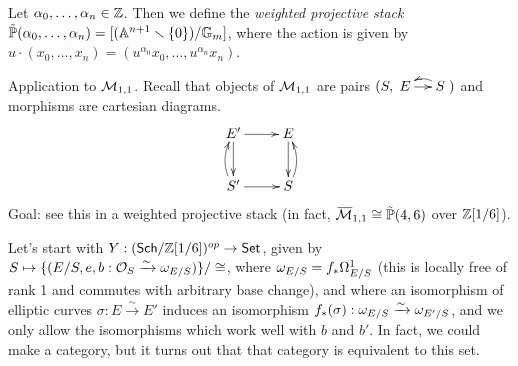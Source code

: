  \begin{example}
   Let $\alpha_0,\dots, \alpha_n\in \mathbb{Z}$. Then we define the
\emph{weighted projective stack} $\tilde {\mathbb{P}}(\alpha_0,\dots,
\alpha_n) = [(\mathbb{A}^{n+1}\smallsetminus\{0\})/\mathbb{G}_m]$, where the action is
given by $u\cdot (x_0,\dots, x_n)=(u^{\alpha_0}x_0,\dots,
u^{\alpha_n}x_n)$.
 \end{example}
 Application to $\mathcal{M}_{1,1}$. Recall that objects of $\mathcal{M}_{1,1}$ are
pairs
 $(S,\xymatrix@-1pc{E\ar[r] & S\ar@/_/[l]})$ and morphisms are
cartesian diagrams.
 \[\xymatrix{
    E'\ar[d]\ar[r] & E\ar[d]\\
    S'\ar[r]\ar@/^/[u] & S\ar@/_/[u]
 }\]
  Goal: see this in a weighted projective stack (in fact,
$\bbar\M_{1,1}\cong
 \tilde\PP(4,6)$ over $\mathbb{Z}[1/6]$).

 Let's start with $Y:(\text{\sf Sch}/\mathbb{Z}[1/6])^{op}\to \text{\sf Set}$, given by $S\mapsto
 \{(E/S,e,b:\mathcal{O}_S\xrightarrow\sim \omega_{E/S})\}/\cong$, where
$\omega_{E/S}=f_*\Omega^1_{E/S}$ (this
 is locally free of rank 1 and commutes with arbitrary base change),
and where an
 isomorphism of elliptic curves $\sigma:E\xrightarrow\sim E'$ induces
an isomorphism
 $f_*(\sigma):\omega_{E/S}\xrightarrow\sim \omega_{E'/S}$, and we only allow
the isomorphisms
 which work well with $b$ and $b'$. In fact, we could make a
category, but it turns out
 that that category is equivalent to this set.

